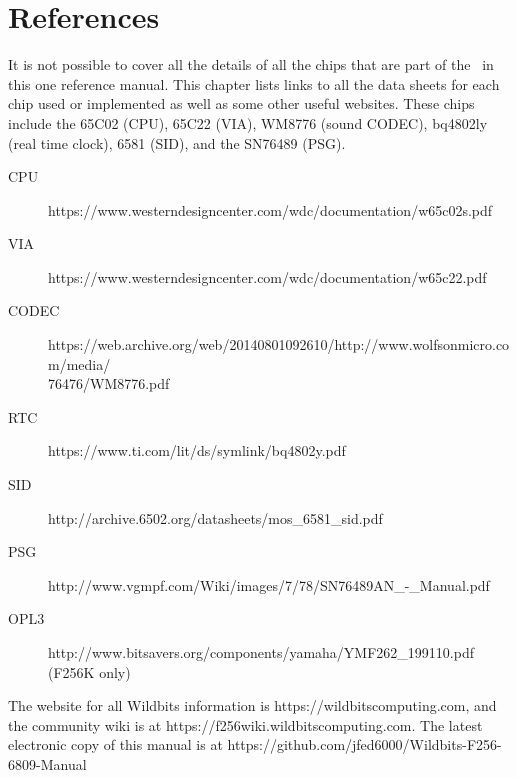 \chapter{References}

It is not possible to cover all the details of all the chips that are part of the \jr\ in this one reference manual. This chapter lists links to all the data sheets for each chip used or implemented as well as some other useful websites. These chips include the 65C02 (CPU), 65C22 (VIA), WM8776 (sound CODEC), bq4802ly (real time clock), 6581 (SID), and the SN76489 (PSG).

\begin{description}
    \item[CPU] https://www.westerndesigncenter.com/wdc/documentation/w65c02s.pdf
    \item[VIA] https://www.westerndesigncenter.com/wdc/documentation/w65c22.pdf
    \item[CODEC] https://web.archive.org/web/20140801092610/http://www.wolfsonmicro.com/media/\\76476/WM8776.pdf
    \item[RTC] https://www.ti.com/lit/ds/symlink/bq4802y.pdf
    \item[SID] http://archive.6502.org/datasheets/mos\_6581\_sid.pdf
    \item[PSG] http://www.vgmpf.com/Wiki/images/7/78/SN76489AN\_-\_Manual.pdf
    \item[OPL3] http://www.bitsavers.org/components/yamaha/YMF262\_199110.pdf (F256K only) 
\end{description}

The website for all Wildbits information is https://wildbitscomputing.com, and the community wiki is at https://f256wiki.wildbitscomputing.com. The latest electronic copy of this manual is at https://github.com/jfed6000/Wildbits-F256-6809-Manual
